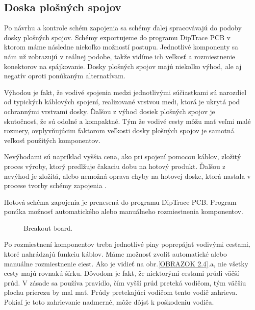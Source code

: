 \subsection{Doska plošných spojov}
\label{PCBcka}

Po návrhu a kontrole schém zapojenia sa schémy ďalej spracovávajú do podoby dosky plošných spojov. Schémy exportujeme do programu DipTrace PCB v ktorom máme následne niekoľko možností postupu. Jednotlivé komponenty sa nám už zobrazujú v reálnej podobe, takže vidíme ich veľkosť a rozmiestnenie konektorov na spájkovanie. Dosky plošných spojov majú niekoľko výhod, ale aj negatív oproti ponúkaným alternatívam\cite{dosky}. 

Výhodou je fakt, že vodivé spojenia medzi jednotlivými súčiastkami sú narozdiel od typických káblových spojení, realizované vrstvou medi, ktorá je ukrytá pod ochrannými vrstvami dosky. Ďalšou z výhod dosiek plošných spojov je skutočnosť, že sú odolné a kompaktné\cite{PCBlife}. Tým že vodivé cesty môžu mať veľmi malé rozmery, ovplyvňujúcim faktorom veľkosti dosky plošných spojov je samotná veľkosť použitých komponentov. 

Nevýhodami sú napríklad vyššia cena, ako pri spojení pomocou káblov, zložitý proces výroby, ktorý predlžuje čakaciu dobu na hotový produkt. Ďalšou z nevýhod je zložitá, alebo nemožná oprava chyby na hotovej doske, ktorá nastala v procese tvorby schémy zapojenia . 

Hotová schéma zapojenia je prenesená do programu DipTrace PCB. Program ponúka možnosť automatického alebo manuálneho rozmiestnenia komponentov.

\begin{figure}[!tbh]
	\hfill
	\hfill
	\hfill
	\caption{Breakout board.}\label{OBRAZOK 2.6}
\end{figure}

Po rozmiestnení komponentov treba jednotlivé piny poprepájať vodivými cestami, ktoré nahrádzajú funkciu káblov. Máme možnosť zvoliť automatické alebo manuálne rozmiestnenie ciest. Ako je vidieť na obr.\ref{OBRAZOK 2.4}.a, nie všetky cesty majú rovnakú šírku. Dôvodom je fakt, že niektorými cestami prúdi väčší prúd. V zásade sa používa pravidlo, čím vyšší prúd preteká vodičom, tým väčšiu plochu prierezu by mal mať. Prúdy pretekajúci vodičom tento vodič zahrieva. Pokiaľ je toto zahrievanie nadmerné, môže dôjsť k poškodeniu vodiča.  

